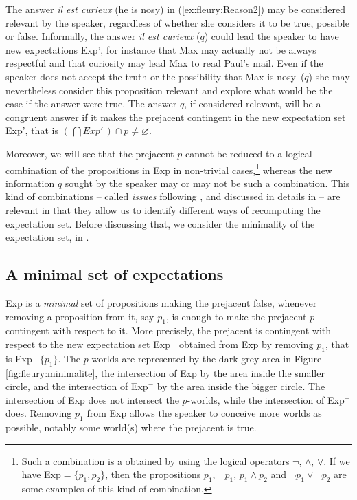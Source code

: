 \documentclass[output=paper,colorlinks,citecolor=brown,
]{langscibook}
\begin{document}
The answer \textit{il est curieux} (he is nosy)
in (\ref{ex:fleury:Reason2}) may be considered relevant by the speaker,
regardless of whether she considers it to be
true, possible or false. Informally, the answer
\textit{il est curieux} ($q$)
could lead the speaker to have new expectations Exp', for instance that Max may actually not be always respectful and that curiosity may lead Max to read Paul's mail. Even if the speaker does not accept the truth or the possibility that 
Max is nosy~($q$)
she may nevertheless consider this proposition relevant and explore what would be the case if the answer were true. The answer $q$, if considered relevant, will be a congruent answer if it makes the prejacent contingent in the new expectation set Exp', that is $(\,\bigcap Exp'\,) \cap p \neq \varnothing$.


Moreover, we will see that the prejacent $p$ cannot be reduced to a logical combination of the propositions in Exp  in non-trivial cases,\footnote{Such a combination is a obtained by using the logical operators $\neg$, $\land$, $\lor$. If we have Exp$=\{p_1,p_2\}$, then the propositions $p_1$, $\neg p_1$, $p_1 \land p_2$ and $\neg p_1 \lor \neg p_2$ are some examples of this kind of combination.}
whereas the new information $q$ sought by the speaker may or may not be such a combination.
This kind of combinations -- called \textit{issues} following \citep{fintelGillies10}, and discussed in details in  -- are relevant in that they allow us to identify different ways of recomputing the expectation set.
Before discussing that, we consider the minimality of the expectation set, 
 in .


\subsection{A minimal set of expectations}\label{sec:fleury:minimal}

Exp is a \textit{minimal} set of propositions making the prejacent false, whenever removing a proposition from it, say $p_1$, is enough to make the prejacent $p$ contingent with respect to it. More precisely, the prejacent is contingent with respect to the new expectation set Exp$^{-}$ obtained from Exp by  removing  $p_1$, that is Exp$-\{p_1\}$.  The $p$-worlds are represented by the dark grey area in  Figure \ref{fig:fleury:minimalite}, the intersection of Exp by the area inside the smaller circle, and the intersection of Exp$^{-}$ by the area inside the bigger circle. The intersection of Exp does not intersect the $p$-worlds, while the intersection of Exp$^{-}$ does. Removing $p_1$ from Exp allows the speaker to conceive more worlds as possible, notably some world(s) where the prejacent is true.
\end{document}
